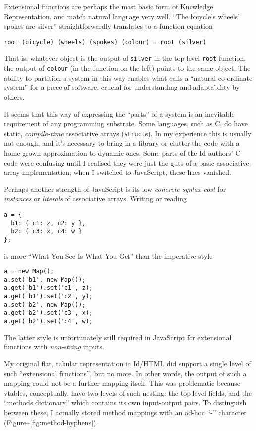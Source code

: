 Extensional functions are perhaps the most basic form of Knowledge
Representation, and match natural language very well. ``The bicycle's
wheels' spokes are silver'' straightforwardly translates to a function
equation

\begin{lstlisting}
root (bicycle) (wheels) (spokes) (colour) = root (silver)
\end{lstlisting}

That is, whatever object is the output of \texttt{silver} in the
top-level \texttt{root} function, the output of \texttt{colour} (in the
function on the left) points to the same object. The ability to
partition a system in this way enables what \cite{externalise} calls a
``natural co-ordinate system'' for a piece of software, crucial for
understanding and adaptability by others.

It seems that this way of expressing the ``parts'' of a system is an
inevitable requirement of any programming substrate. Some languages,
such as C, do have static, \emph{compile-time} associative arrays
(\texttt{struct}s). In my experience this is usually not enough, and
it's necessary to bring in a library or clutter the code with a
home-grown approximation to dynamic ones. Some parts of the Id{}
authors' C code were confusing until I realised they were just the guts
of a basic associative-array implementation; when I switched to
JavaScript, these lines vanished.

Perhaps another strength of JavaScript is its low \emph{concrete syntax
cost} for \emph{instances} or \emph{literals} of associative arrays.
Writing or reading

\begin{lstlisting}
a = {
  b1: { c1: z, c2: y },
  b2: { c3: x, c4: w }
};
\end{lstlisting}

is more ``What You See Is What You Get'' than the imperative-style

\begin{lstlisting}
a = new Map();
a.set('b1', new Map());
a.get('b1').set('c1', z);
a.get('b1').set('c2', y);
a.set('b2', new Map());
a.get('b2').set('c3', x);
a.get('b2').set('c4', w);
\end{lstlisting}

The latter style is unfortunately still required in JavaScript for
extensional functions with \emph{non-string} inputs.

My original flat, tabular representation in Id{}/HTML did support a
single level of such ``extensional functions'', but no more. In other
words, the output of such a mapping could not be a further mapping
itself. This was problematic because vtables, conceptually, have two
levels of such nesting: the top-level fields, and the ``methods
dictionary'' which contains its own input-output pairs. To distinguish
between these, I actually stored method mappings with an ad-hoc ``-''
character (Figure\textasciitilde{}\ref{fig:method-hyphens}).

